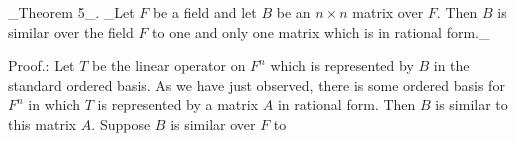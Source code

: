 _Theorem 5_. _Let \(F\) be a field and let \(B\) be an \(n\times n\) matrix over \(F\). Then \(B\) is similar over the field \(F\) to one and only one matrix which is in rational form._

Proof.: Let \(T\) be the linear operator on \(F^{n}\) which is represented by \(B\) in the standard ordered basis. As we have just observed, there is some ordered basis for \(F^{n}\) in which \(T\) is represented by a matrix \(A\) in rational form. Then \(B\) is similar to this matrix \(A\). Suppose \(B\) is similar over \(F\) to 